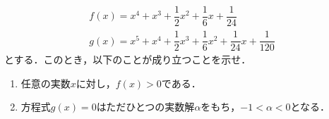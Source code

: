 \documentclass[../../main.tex]{subfiles}
\begin{document}
\begin{align*}
  f(x)=x^4+x^3+\dfrac{1}{2}x^2+\dfrac{1}{6}x+\dfrac{1}{24} \\
  g(x)=x^5+x^4+\dfrac{1}{2}x^3+\dfrac{1}{6}x^2+\dfrac{1}{24}x+\dfrac{1}{120}
\end{align*}
とする．このとき，以下のことが成り立つことを示せ．
\begin{enumerate}
  \item 任意の実数$x$に対し，$f(x)>0$である．
  \item 方程式$g(x)=0$はただひとつの実数解$\alpha$をもち，$-1<\alpha<0$となる．
\end{enumerate}
\end{document}
